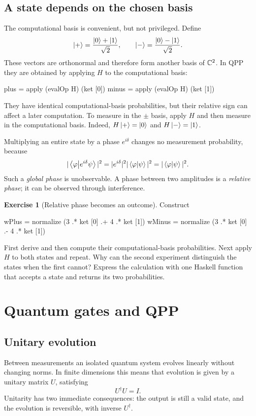 \documentclass[11pt,a4paper]{article}
\theoremstyle{definition}
\newtheorem{exercise}{Exercise}[section]
\begin{document}
\subsection{A state depends on the chosen basis}

The computational basis is convenient, but not privileged.  Define
\[
  \left| + \right\rangle=\frac{\left| 0 \right\rangle+\left| 1 \right\rangle}{\sqrt2},\qquad
  \left| - \right\rangle=\frac{\left| 0 \right\rangle-\left| 1 \right\rangle}{\sqrt2}.
\]
These vectors are orthonormal and therefore form another basis of $\mathbb{C}^2$.
In QPP they are obtained by applying $H$ to the computational basis:
\begin{qppcode}
plus  = apply (evalOp H) (ket [0])
minus = apply (evalOp H) (ket [1])
\end{qppcode}
They have identical computational-basis probabilities, but their relative
sign can affect a later computation.  To measure in the $\pm$ basis, apply
$H$ and then measure in the computational basis.  Indeed,
$H\left| + \right\rangle=\left| 0 \right\rangle$ and $H\left| - \right\rangle=\left| 1 \right\rangle$.

Multiplying an entire state by a phase $e^{i\delta}$ changes no measurement
probability, because
\[
  |\left\langle \varphi \middle| e^{i\delta}\psi \right\rangle|^2
  =|e^{i\delta}|^2|\left\langle \varphi \middle| \psi \right\rangle|^2
  =|\left\langle \varphi \middle| \psi \right\rangle|^2.
\]
Such a \emph{global phase} is unobservable.  A phase between two amplitudes
is a \emph{relative phase}; it can be observed through interference.

\begin{exercise}[Relative phase becomes an outcome]
Construct
\begin{qppcode}
wPlus  = normalize (3 .* ket [0] .+ 4 .* ket [1])
wMinus = normalize (3 .* ket [0] .- 4 .* ket [1])
\end{qppcode}
First derive and then compute their computational-basis probabilities.  Next
apply $H$ to both states and repeat.  Why can the second experiment distinguish
the states when the first cannot?  Express the calculation with one Haskell
function that accepts a state and returns its two probabilities.
\end{exercise}

\section{Quantum gates and QPP}
\label{sec:gates}

\subsection{Unitary evolution}

Between measurements an isolated quantum system evolves linearly without
changing norms.  In finite dimensions this means that evolution is given by
a unitary matrix $U$, satisfying
\[
  U^\dagger U=I.
\]
Unitarity has two immediate consequences: the output is still a valid state,
and the evolution is reversible, with inverse $U^\dagger$.
\end{document}
